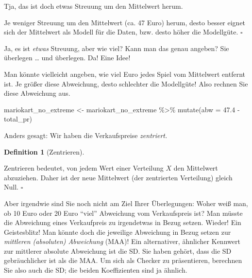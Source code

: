 \documentclass[
  letterpaper,
]{scrbook}
\newenvironment{Shaded}{\begin{snugshade}}{\end{snugshade}}
\newcommand{\AttributeTok}[1]{\textcolor[rgb]{0.40,0.45,0.13}{#1}}
\newcommand{\FloatTok}[1]{\textcolor[rgb]{0.68,0.00,0.00}{#1}}
\newcommand{\FunctionTok}[1]{\textcolor[rgb]{0.28,0.35,0.67}{#1}}
\newcommand{\NormalTok}[1]{\textcolor[rgb]{0.00,0.23,0.31}{#1}}
\newcommand{\OtherTok}[1]{\textcolor[rgb]{0.00,0.23,0.31}{#1}}
\newcommand{\SpecialCharTok}[1]{\textcolor[rgb]{0.37,0.37,0.37}{#1}}
\theoremstyle{definition}
\theoremstyle{definition}
\theoremstyle{definition}
\newtheorem{definition}{Definition}[chapter]
\theoremstyle{remark}
\begin{document}
Tja, das ist doch etwas Streuung um den Mittelwert herum.

\begin{tcolorbox}[enhanced jigsaw, colbacktitle=quarto-callout-important-color!10!white, toptitle=1mm, colframe=quarto-callout-important-color-frame, breakable, toprule=.15mm, bottomrule=.15mm, bottomtitle=1mm, left=2mm, opacitybacktitle=0.6, colback=white, arc=.35mm, coltitle=black, title=\textcolor{quarto-callout-important-color}{\faExclamation}\hspace{0.5em}{Wichtig}, opacityback=0, rightrule=.15mm, leftrule=.75mm, titlerule=0mm]

Je weniger Streuung um den Mittelwert (ca. 47 Euro) herum, desto besser
eignet sich der Mittelwert als Modell für die Daten, bzw. desto höher
die Modellgüte. \(\square\)

\end{tcolorbox}

Ja, es ist \emph{etwas} Streuung, aber wie viel? Kann man das genau
angeben? Sie überlegen \ldots{} und überlegen. Da! Eine Idee!

Man könnte vielleicht angeben, wie viel Euro jedes Spiel vom Mittelwert
entfernt ist. Je größer diese Abweichung, desto schlechter die
Modellgüte! Also rechnen Sie diese Abweichung aus.

\begin{Shaded}
\begin{Highlighting}[]
\NormalTok{mariokart\_no\_extreme }\OtherTok{\textless{}{-}}
\NormalTok{  mariokart\_no\_extreme }\SpecialCharTok{\%\textgreater{}\%} 
  \FunctionTok{mutate}\NormalTok{(}\AttributeTok{abw =} \FloatTok{47.4} \SpecialCharTok{{-}}\NormalTok{ total\_pr)}
\end{Highlighting}
\end{Shaded}

Anders gesagt: Wir haben die Verkaufspreise \emph{zentriert.}

\begin{definition}[Zentrieren]\protect\hypertarget{def-zentrieren}{}\label{def-zentrieren}

Zentrieren bedeutet, von jedem Wert einer Verteilung \(X\) den
Mittelwert abzuziehen. Daher ist der neue Mittelwert (der zentrierten
Verteilung) gleich Null. \(\square\)

\end{definition}

Aber irgendwie sind Sie noch nicht am Ziel Ihrer Überlegungen: Woher
weiß man, ob 10 Euro oder 20 Euro \enquote{viel} Abweichung vom
Verkaufspreis ist? Man müsste die Abweichung eines Verkaufpreis zu
irgendetwas in Bezug setzen. Wieder! Ein Geistesblitz! Man könnte doch
die jeweilige Abweichung in Bezug setzen zur \emph{mittleren (absoluten)
Abweichung} (MAA)! Ein alternativer, ähnlicher Kennwert zur mittlerer
absolute Abweichung ist die SD. Sie haben gehört, dass die SD
gebräuchlicher ist als die MAA. Um sich als Checker zu präsentieren,
berechnen Sie also auch die SD; die beiden Koeffizienten sind ja
ähnlich.
\end{document}
